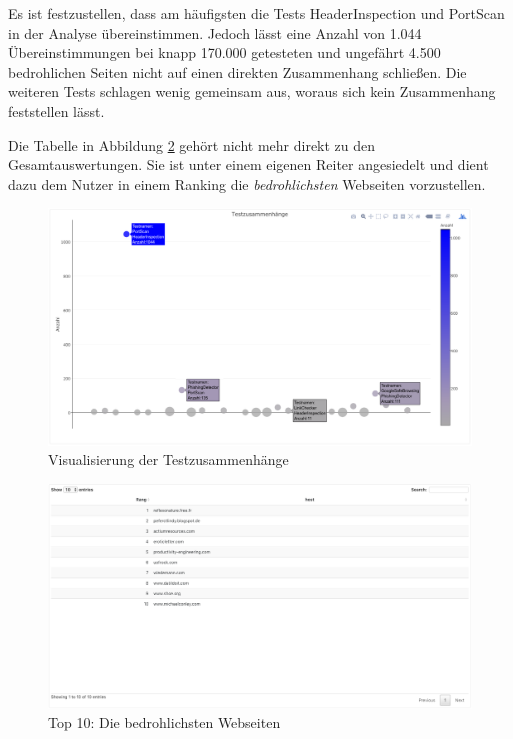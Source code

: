 Es ist festzustellen, dass am häufigsten die Tests HeaderInspection und PortScan in der Analyse übereinstimmen. Jedoch lässt eine Anzahl von 1.044 Übereinstimmungen bei knapp 170.000 getesteten und ungefährt 4.500 bedrohlichen Seiten nicht auf einen direkten Zusammenhang schließen. Die weiteren Tests schlagen wenig gemeinsam aus, woraus sich kein Zusammenhang feststellen lässt.

Die Tabelle in Abbildung \ref{fig:analyse-top10} gehört nicht mehr direkt zu den Gesamtauswertungen. Sie ist unter einem eigenen Reiter angesiedelt und dient dazu dem Nutzer in einem Ranking die \textit{bedrohlichsten} Webseiten vorzustellen.

\begin{figure}[H]
  \centering
  \includegraphics[width=\textwidth]{images/stats/testzusammenhaenge}
  \caption[Visualisierung der Testzusammenhänge]{Visualisierung der Testzusammenhänge\protect\footnotemark}
  \label{fig:analyse-testzusammenhaenge}
\end{figure}

\begin{figure}[H]
  \centering
  \includegraphics[width=\textwidth]{images/stats/top10}
  \caption[Top 10: Die bedrohlichsten Webseiten]{Top 10: Die bedrohlichsten Webseiten\protect\footnotemark}
  \label{fig:analyse-top10}
\end{figure}

